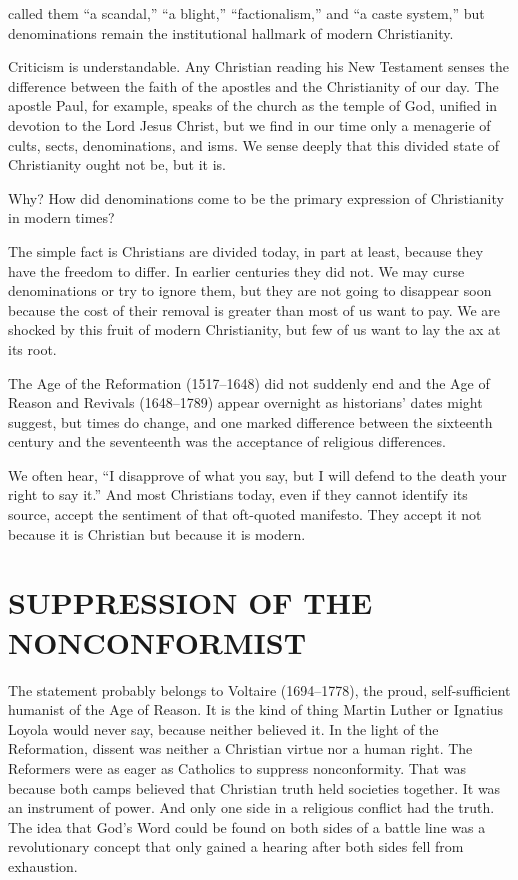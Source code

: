 
 called them “a scandal,” “a blight,” “factionalism,” and “a
caste system,” but denominations remain the institutional hallmark of modern Christianity.

Criticism is understandable. Any Christian reading his New Testament senses the difference between
the faith of the apostles and the Christianity of our day. The apostle Paul, for example, speaks of
the church as the temple of God, unified in devotion to the Lord Jesus Christ, but we find in our
time only a menagerie of cults, sects, denominations, and isms. We sense deeply that this divided
state of Christianity ought not be, but it is.

Why? How did denominations come to be the primary expression of Christianity in modern times?

The simple fact is Christians are divided today, in part at least, because they have the freedom to
differ. In earlier centuries they did not. We may curse denominations or try to ignore them, but
they are not going to disappear soon because the cost of their removal is greater than most of us
want to pay. We are shocked by this fruit of modern Christianity, but few of us want to lay the ax
at its root.

The Age of the Reformation (1517–1648) did not suddenly end and the Age of Reason and Revivals
(1648–1789) appear overnight as historians’ dates might suggest, but times do change, and one marked
difference between the sixteenth century and the seventeenth was the acceptance of religious
differences.

We often hear, “I disapprove of what you say, but I will defend to the death your right to say it.”
And most Christians today, even if they cannot identify its source, accept the sentiment of that
oft-quoted manifesto. They accept it not because it is Christian but because it is modern.

\section{SUPPRESSION OF THE NONCONFORMIST}

The statement probably belongs to Voltaire (1694–1778), the proud, self-sufficient humanist of the
Age of Reason. It is the kind of thing Martin Luther or Ignatius Loyola would never say, because
neither believed it. In the light of the Reformation, dissent was neither a Christian virtue nor a
human right. The Reformers were as eager as Catholics to suppress nonconformity. That was because
both camps believed that Christian truth held societies together. It was an instrument of power. And
only one side in a religious conflict had the truth. The idea that God’s Word could be found on both
sides of a battle line was a revolutionary concept that only gained a hearing after both sides fell
from exhaustion.

